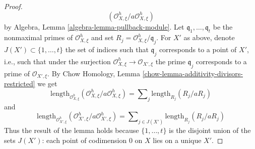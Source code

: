 \begin{proof}
$$(\mathcal{O}_{X, \xi}^h/a \mathcal{O}_{X, \xi}^h)
$$
by Algebra, Lemma \ref{algebra-lemma-pullback-module}.
Let $\mathfrak q_1, \ldots, \mathfrak q_t$ be the nonmaximal
primes of $\mathcal{O}_{X, \xi}^h$ and set
$R_j = \mathcal{O}_{X, \xi}^h/\mathfrak q_j$.
For $X'$ as above, denote $J(X') \subset \{1, \ldots, t\}$
the set of indices such that $\mathfrak q_j$ corresponds
to a point of $X'$, i.e., such that under the surjection
$\mathcal{O}_{X, \xi}^h \to \mathcal{O}_{X', \xi}$
the prime $\mathfrak q_j$ corresponds to a prime
of $\mathcal{O}_{X', \xi}$.
By Chow Homology, Lemma \ref{chow-lemma-additivity-divisors-restricted}
we get
$$
\text{length}_{\mathcal{O}_{X, \xi}^h}
(\mathcal{O}_{X, \xi}^h/a \mathcal{O}_{X, \xi}^h) =
\sum\nolimits_j \text{length}_{R_j}(R_j/a R_j)
$$
and
$$
\text{length}_{\mathcal{O}_{X', \xi}^h}
(\mathcal{O}_{X', \xi}^h/a \mathcal{O}_{X', \xi}^h) =
\sum\nolimits_{j \in J(X')} \text{length}_{R_j}(R_j/a R_j)
$$
Thus the result of the lemma holds because
$\{1, \ldots, t\}$ is the disjoint union of the sets $J(X')$:
each point of codimension $0$ on $X$ lies on a unique $X'$.
\end{proof}
